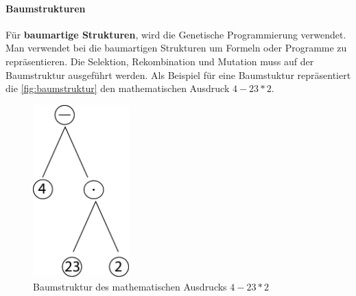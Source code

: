 \paragraph{Baumstrukturen}
F{\"u}r \textbf{baumartige Strukturen}, wird die Genetische Programmierung verwendet. Man verwendet bei die baumartigen Strukturen um Formeln oder Programme zu repr{\"a}sentieren. Die Selektion, Rekombination und Mutation muss auf der Baumstruktur ausgef{\"u}hrt werden.
Als Beispiel f{\"u}r eine Baumstuktur repr{\"a}sentiert die \autoref{fig:baumstruktur} den mathematischen Ausdruck $4 - 23 * 2$.

\begin{figure}
	\centering
    \includegraphics[width=0.33\textwidth]{pics/grundlage/baumstruktur.png}
    \caption{Baumstruktur des mathematischen Ausdrucks $4 - 23 * 2$}
    \label{fig:baumstruktur}
\end{figure}













